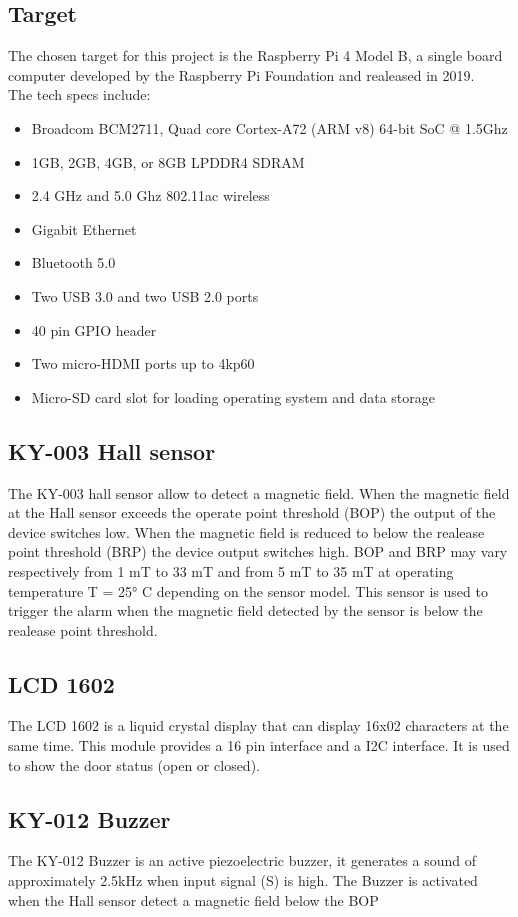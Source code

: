 \documentclass{article}
\begin{document}
\subsection{Target}
The chosen target for this project is the Raspberry Pi 4 Model B, a single board computer developed by 
the Raspberry Pi Foundation and realeased in 2019.
\\
The tech specs include:
\begin{itemize} 
    \item Broadcom BCM2711, Quad core Cortex-A72 (ARM v8) 64-bit SoC @ 1.5Ghz
    \item 1GB, 2GB, 4GB, or 8GB LPDDR4 SDRAM
    \item 2.4 GHz and 5.0 Ghz 802.11ac wireless
    \item Gigabit Ethernet
    \item Bluetooth 5.0
    \item Two USB 3.0 and two USB 2.0 ports
    \item 40 pin GPIO header
    \item Two micro-HDMI ports up to 4kp60
    \item Micro-SD card slot for loading operating system and data storage
\end{itemize}

\subsection{KY-003 Hall sensor}
The KY-003 hall sensor allow to detect a magnetic field. When the magnetic field at the Hall sensor exceeds
the operate point threshold (BOP) the output of the device switches low. When the magnetic field is reduced
to below the realease point threshold (BRP) the device output switches high.
BOP and BRP may vary respectively from 1 mT to 33 mT and from 5 mT to 35 mT at operating 
temperature T = 25° C depending on the sensor model.
This sensor is used to trigger
the alarm when the  magnetic field detected by the sensor is below the realease point threshold. 

\subsection{LCD 1602}
The LCD 1602 is a liquid crystal display that can display 16x02 characters at the same time. 
This module provides a 16 pin interface and a I2C interface. 
It is used to show the door status (open or closed).

\subsection{KY-012 Buzzer}
The KY-012 Buzzer is an active piezoelectric buzzer, it generates a sound of approximately 2.5kHz when 
input signal (S) is high. The Buzzer is activated when the Hall sensor detect a magnetic field below the BOP
\end{document}
